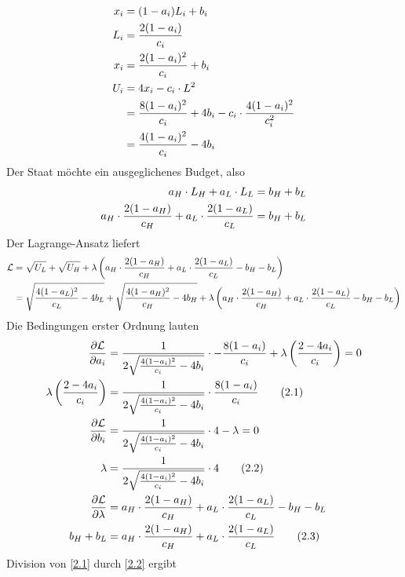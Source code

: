 \documentclass{article}
\begin{document}
\begin{enumerate}[label=(\alph*)]
		\begin{align}
			x_i &= (1-a_i)L_i + b_i \notag \\
			L_i &= \frac{2(1-a_i)}{c_i} \notag \\
			x_i &= \frac{2(1-a_i)^2}{c_i} + b_i \notag \\
			U_i &= 4x_i - c_i\cdot L^2 \notag \\
			&= \frac{8(1-a_i)^2}{c_i} + 4b_i - c_i\cdot\frac{4(1-a_i)^2}{c_i^2} \notag \\
			&= \frac{4(1-a_i)^2}{c_i}-4b_i \notag
		\end{align}
		Der Staat möchte ein ausgeglichenes Budget, also
		\begin{align}
			a_H\cdot L_H + a_L\cdot L_L &= b_H + b_L \notag \\
			a_H\cdot\frac{2(1-a_H)}{c_H} + a_L\cdot\frac{2(1-a_L)}{c_L} &= b_H + b_L \notag
		\end{align}
		Der Lagrange-Ansatz liefert
		\begin{align}
			\mathcal{L} &= \sqrt{U_L} + \sqrt{U_H} + \lambda\left(a_H\cdot\frac{2(1-a_H)}{c_H} + a_L\cdot\frac{2(1-a_L)}{c_L} - b_H - b_L\right) \notag \\
			&= \sqrt{\frac{4(1-a_L)^2}{c_L}-4b_L} + \sqrt{\frac{4(1-a_H)^2}{c_H}-4b_H} + \lambda\left(a_H\cdot\frac{2(1-a_H)}{c_H} + a_L\cdot\frac{2(1-a_L)}{c_L} - b_H - b_L\right) \notag
		\end{align}
		Die Bedingungen erster Ordnung lauten
		\begin{align}
			\frac{\partial\mathcal{L}}{\partial a_i} &= \frac{1}{2\sqrt{\frac{4(1-a_i)^2}{c_i}-4b_i}} \cdot -\frac{8(1-a_i)}{c_i} + \lambda\left(\frac{2-4a_i}{c_i}\right) = 0 \notag \\
			\label{2.1}
			\lambda\left(\frac{2-4a_i}{c_i}\right) &= \frac{1}{2\sqrt{\frac{4(1-a_i)^2}{c_i}-4b_i}} \cdot \frac{8(1-a_i)}{c_i} \tag{2.1} \\
			\frac{\partial\mathcal{L}}{\partial b_i} &= \frac{1}{2\sqrt{\frac{4(1-a_i)^2}{c_i}-4b_i}}\cdot 4-\lambda = 0 \notag \\
			\label{2.2}
			\lambda &= \frac{1}{2\sqrt{\frac{4(1-a_i)^2}{c_i}-4b_i}}\cdot 4 \tag{2.2} \\
			\frac{\partial\mathcal{L}}{\partial\lambda} &= a_H\cdot\frac{2(1-a_H)}{c_H} + a_L\cdot\frac{2(1-a_L)}{c_L} - b_H - b_L \notag \\
			\label{2.3}
			b_H + b_L &= a_H\cdot\frac{2(1-a_H)}{c_H} + a_L\cdot\frac{2(1-a_L)}{c_L} \tag{2.3}
		\end{align}
		Division von \eqref{2.1} durch \eqref{2.2} ergibt

\end{enumerate}
\end{document}
